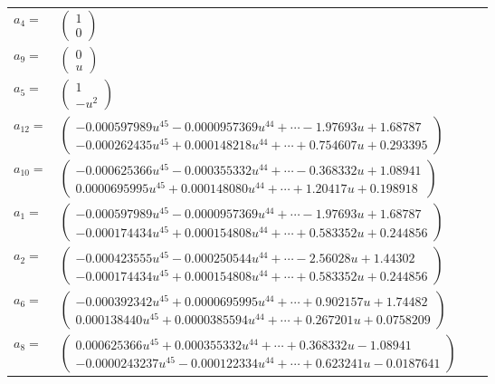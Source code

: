 \documentclass[1p]{elsarticle_modified}
\theoremstyle{definition}
\begin{document}
\begin{tabular}{m{7pt} m{180pt} m{7pt} m{180pt} }
\flushright $a_{4}=$&$\begin{pmatrix}1\\0\end{pmatrix}$ \\
\flushright $a_{9}=$&$\begin{pmatrix}0\\u\end{pmatrix}$ \\
\flushright $a_{5}=$&$\begin{pmatrix}1\\- u^2\end{pmatrix}$ \\
\flushright $a_{12}=$&$\begin{pmatrix}-0.000597989 u^{45}-0.0000957369 u^{44}+\cdots-1.97693 u+1.68787\\-0.000262435 u^{45}+0.000148218 u^{44}+\cdots+0.754607 u+0.293395\end{pmatrix}$ \\
\flushright $a_{10}=$&$\begin{pmatrix}-0.000625366 u^{45}-0.000355332 u^{44}+\cdots-0.368332 u+1.08941\\0.0000695995 u^{45}+0.000148080 u^{44}+\cdots+1.20417 u+0.198918\end{pmatrix}$ \\
\flushright $a_{1}=$&$\begin{pmatrix}-0.000597989 u^{45}-0.0000957369 u^{44}+\cdots-1.97693 u+1.68787\\-0.000174434 u^{45}+0.000154808 u^{44}+\cdots+0.583352 u+0.244856\end{pmatrix}$ \\
\flushright $a_{2}=$&$\begin{pmatrix}-0.000423555 u^{45}-0.000250544 u^{44}+\cdots-2.56028 u+1.44302\\-0.000174434 u^{45}+0.000154808 u^{44}+\cdots+0.583352 u+0.244856\end{pmatrix}$ \\
\flushright $a_{6}=$&$\begin{pmatrix}-0.000392342 u^{45}+0.0000695995 u^{44}+\cdots+0.902157 u+1.74482\\0.000138440 u^{45}+0.0000385594 u^{44}+\cdots+0.267201 u+0.0758209\end{pmatrix}$ \\
\flushright $a_{8}=$&$\begin{pmatrix}0.000625366 u^{45}+0.000355332 u^{44}+\cdots+0.368332 u-1.08941\\-0.0000243237 u^{45}-0.000122334 u^{44}+\cdots+0.623241 u-0.0187641\end{pmatrix}$ \\

\end{tabular}
\end{document}
